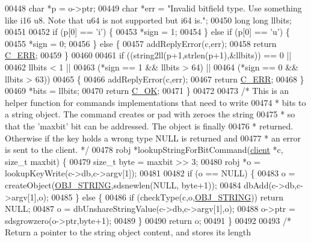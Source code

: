 \begin{DoxyCode}
{00448     \textcolor{keywordtype}{char} *p = o->ptr;
00449     \textcolor{keywordtype}{char} *err = \textcolor{stringliteral}{"Invalid bitfield type. Use something like i16 u8. Note that u64 is not supported but
       i64 is."};
00450     \textcolor{keywordtype}{long} \textcolor{keywordtype}{long} llbits;
00451 
00452     \textcolor{keywordflow}{if} (p[0] == \textcolor{stringliteral}{'i'}) \{
00453         *sign = 1;
00454     \} \textcolor{keywordflow}{else} \textcolor{keywordflow}{if} (p[0] == \textcolor{stringliteral}{'u'}) \{
00455         *sign = 0;
00456     \} \textcolor{keywordflow}{else} \{
00457         addReplyError(c,err);
00458         \textcolor{keywordflow}{return} \hyperlink{server_8h_af98ac28d5f4d23d7ed5985188e6fb7d1}{C\_ERR};
00459     \}
00460 
00461     \textcolor{keywordflow}{if} ((string2ll(p+1,strlen(p+1),&llbits)) == 0 ||
00462         llbits < 1 ||
00463         (*sign == 1 && llbits > 64) ||
00464         (*sign == 0 && llbits > 63))
00465     \{
00466         addReplyError(c,err);
00467         \textcolor{keywordflow}{return} \hyperlink{server_8h_af98ac28d5f4d23d7ed5985188e6fb7d1}{C\_ERR};
00468     \}
00469     *bits = llbits;
00470     \textcolor{keywordflow}{return} \hyperlink{server_8h_a303769ef1065076e68731584e758d3e1}{C\_OK};
00471 \}
00472 
00473 \textcolor{comment}{/* This is an helper function for commands implementations that need to write}
00474 \textcolor{comment}{ * bits to a string object. The command creates or pad with zeroes the string}
00475 \textcolor{comment}{ * so that the 'maxbit' bit can be addressed. The object is finally}
00476 \textcolor{comment}{ * returned. Otherwise if the key holds a wrong type NULL is returned and}
00477 \textcolor{comment}{ * an error is sent to the client. */}
00478 robj *lookupStringForBitCommand(\hyperlink{structclient}{client} *c, size\_t maxbit) \{
00479     size\_t byte = maxbit >> 3;
00480     robj *o = lookupKeyWrite(c->db,c->argv[1]);
00481 
00482     \textcolor{keywordflow}{if} (o == NULL) \{
00483         o = createObject(\hyperlink{server_8h_a65236ea160f69cdef33ec942092af88f}{OBJ\_STRING},sdsnewlen(NULL, byte+1));
00484         dbAdd(c->db,c->argv[1],o);
00485     \} \textcolor{keywordflow}{else} \{
00486         \textcolor{keywordflow}{if} (checkType(c,o,\hyperlink{server_8h_a65236ea160f69cdef33ec942092af88f}{OBJ\_STRING})) \textcolor{keywordflow}{return} NULL;
00487         o = dbUnshareStringValue(c->db,c->argv[1],o);
00488         o->ptr = sdsgrowzero(o->ptr,byte+1);
00489     \}
00490     \textcolor{keywordflow}{return} o;
00491 \}
00492 
00493 \textcolor{comment}{/* Return a pointer to the string object content, and stores its length}
}
\end{DoxyCode}
